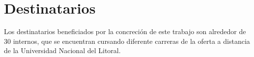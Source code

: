 \chapter{Destinatarios}\label{cap:destinatarios}

    Los destinatarios beneficiados por la concreción de este trabajo son alrededor 
    de 30 internos, que se encuentran cursando diferente carreras de la oferta a distancia de la Universidad Nacional del Litoral.\par
